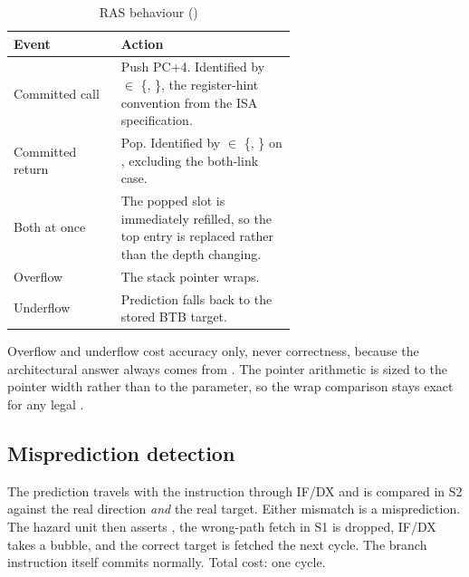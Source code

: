 \begin{table}[H]
\centering
\caption{RAS behaviour ()}
\label{tab:ras}
\begin{tabular}{@{}lL{0.62\linewidth}@{}}
\toprule
\textbf{Event} & \textbf{Action} \\
\midrule
Committed call  & Push PC+4. Identified by  $\in$ \{, \}, the register-hint
                  convention from the ISA specification. \\
Committed return & Pop. Identified by  $\in$ \{, \} on ,
                  excluding the both-link case. \\
Both at once    & The popped slot is immediately refilled, so the top entry is replaced rather
                  than the depth changing. \\
Overflow        & The stack pointer wraps. \\
Underflow       & Prediction falls back to the stored BTB target. \\
\bottomrule
\end{tabular}
\end{table}

Overflow and underflow cost accuracy only, never correctness, because the
architectural answer always comes from . The pointer
arithmetic is sized to the pointer width rather than to the parameter, so the
wrap comparison stays exact for any legal .

\subsection{Misprediction detection}

The prediction travels with the instruction through IF/DX and is compared in S2
against the real direction \emph{and} the real target. Either mismatch is a
misprediction. The hazard unit then asserts , the wrong-path fetch
in S1 is dropped, IF/DX takes a bubble, and the correct target is fetched the
next cycle. The branch instruction itself commits normally. Total cost: one
cycle.
